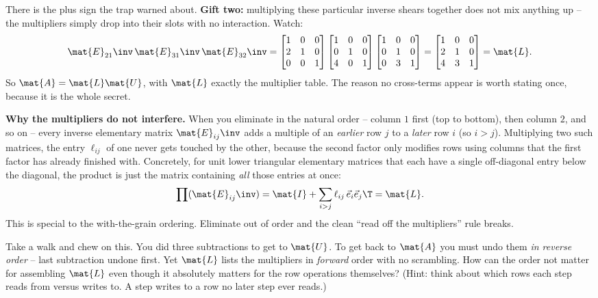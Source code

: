 There is the plus sign the trap warned about. \textbf{Gift two:} multiplying these
particular inverse shears together does not mix anything up -- the multipliers simply drop
into their slots with no interaction. Watch:
\[
  \mat{E}_{21}\inv\,\mat{E}_{31}\inv\,\mat{E}_{32}\inv
  = \begin{bmatrix} 1&0&0\\2&1&0\\0&0&1 \end{bmatrix}
    \begin{bmatrix} 1&0&0\\0&1&0\\4&0&1 \end{bmatrix}
    \begin{bmatrix} 1&0&0\\0&1&0\\0&3&1 \end{bmatrix}
  = \begin{bmatrix} 1&0&0\\2&1&0\\4&3&1 \end{bmatrix} = \mat{L}.
\]
So $\mat{A} = \mat{L}\mat{U}$, with $\mat{L}$ exactly the multiplier table. The reason no
cross-terms appear is worth stating once, because it is the whole secret.

\begin{formalbox}
\textbf{Why the multipliers do not interfere.} When you eliminate in the natural order --
column $1$ first (top to bottom), then column $2$, and so on -- every inverse elementary
matrix $\mat{E}_{ij}\inv$ adds a multiple of an \emph{earlier} row $j$ to a \emph{later} row
$i$ (so $i>j$). Multiplying two such matrices, the entry $\ell_{ij}$ of one never gets
touched by the other, because the second factor only modifies rows using columns that the
first factor has already finished with. Concretely, for unit lower triangular elementary
matrices that each have a single off-diagonal entry below the diagonal, the product is just
the matrix containing \emph{all} those entries at once:
\[
  \prod (\mat{E}_{ij}\inv) = \mat{I} + \sum_{i>j} \ell_{ij}\,\vec{e}_i \vec{e}_j\T = \mat{L}.
\]
This is special to the with-the-grain ordering. Eliminate out of order and the clean
``read off the multipliers'' rule breaks.
\end{formalbox}

\begin{walkbox}
Take a walk and chew on this. You did three subtractions to get to $\mat{U}$. To get back
to $\mat{A}$ you must undo them \emph{in reverse order} -- last subtraction undone first.
Yet $\mat{L}$ lists the multipliers in \emph{forward} order with no scrambling. How can the
order not matter for assembling $\mat{L}$ even though it absolutely matters for the row
operations themselves? (Hint: think about which rows each step reads from versus writes to.
A step writes to a row no later step ever reads.)
\end{walkbox}

